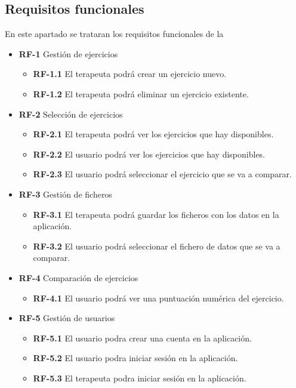 \subsection{Requisitos funcionales}
En este apartado se trataran los requisitos funcionales de la 
\begin{itemize}
		\item \textbf{RF-1} Gestión de ejercicios
	\begin{itemize}
		\item \textbf{RF-1.1}  El terapeuta podrá crear un ejercicio nuevo.
		\item \textbf{RF-1.2} El terapeuta podrá eliminar un ejercicio existente.
	\end{itemize}
	\item \textbf{RF-2} Selección de ejercicios
	\begin{itemize}
		\item \textbf{RF-2.1}  El terapeuta podrá ver los ejercicios que hay disponibles.
		\item \textbf{RF-2.2} El usuario podrá ver los ejercicios que hay disponibles.
		\item \textbf{RF-2.3} El usuario podrá seleccionar el ejercicio que se va a comparar.
	\end{itemize}
	\item \textbf{RF-3} Gestión de ficheros
	\begin{itemize}
		\item \textbf{RF-3.1}  El terapeuta podrá guardar los ficheros con los datos en la aplicación.
		\item \textbf{RF-3.2} El usuario podrá seleccionar el fichero de datos que se va a comparar.
	\end{itemize}
	\item \textbf{RF-4} Comparación de ejercicios 
	\begin{itemize} 
		\item \textbf{RF-4.1}  El usuario podrá ver una puntuación numérica del ejercicio.
	\end{itemize}
	\item  \textbf{RF-5} Gestión de usuarios
	\begin{itemize}
		\item \textbf{RF-5.1} El usuario  podra crear una cuenta en la aplicación.
		\item \textbf{RF-5.2} El usuario podra iniciar sesión en la aplicación.
		\item \textbf{RF-5.3} El terapeuta podra iniciar sesión en la aplicación.
	\end{itemize}
\end{itemize}
